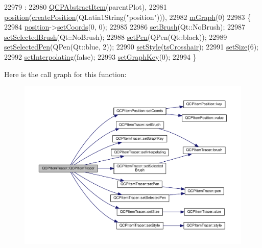 \begin{DoxyCode}
22979                                                     :
22980   \hyperlink{class_q_c_p_abstract_item_a9922507d8b4503a1fe1ed0b1030e23b6}{QCPAbstractItem}(parentPlot),
22981   \hyperlink{class_q_c_p_item_tracer_a69917e2fdb2b3a929c196958feee7cbe}{position}(\hyperlink{class_q_c_p_abstract_item_a75036d39c4d4e2e1a7dd145fff915d32}{createPosition}(QLatin1String(\textcolor{stringliteral}{"position"}))),
22982   \hyperlink{class_q_c_p_item_tracer_a2d70cf616b579563aa15f796dfc143ac}{mGraph}(0)
22983 \{
22984   \hyperlink{class_q_c_p_item_tracer_a69917e2fdb2b3a929c196958feee7cbe}{position}->\hyperlink{class_q_c_p_item_position_aa988ba4e87ab684c9021017dcaba945f}{setCoords}(0, 0);
22985 
22986   \hyperlink{class_q_c_p_item_tracer_a2c303f7470a30084daa201ed556b3c36}{setBrush}(Qt::NoBrush);
22987   \hyperlink{class_q_c_p_item_tracer_a0f55c084980a7a312af859d3e7b558ef}{setSelectedBrush}(Qt::NoBrush);
22988   \hyperlink{class_q_c_p_item_tracer_af8048636fc1ef0152e51809b008df2ca}{setPen}(QPen(Qt::black));
22989   \hyperlink{class_q_c_p_item_tracer_ae1bf70db7f13f928660168cd3e5069f3}{setSelectedPen}(QPen(Qt::blue, 2));
22990   \hyperlink{class_q_c_p_item_tracer_a41a2ac4f1acd7897b4e2a2579c03204e}{setStyle}(\hyperlink{class_q_c_p_item_tracer_a2f05ddb13978036f902ca3ab47076500af562ec81ac3ba99e26ef8540cf1ec16f}{tsCrosshair});
22991   \hyperlink{class_q_c_p_item_tracer_ae47fe0617f5fef5fdb766999569be10a}{setSize}(6);
22992   \hyperlink{class_q_c_p_item_tracer_a6c244a9d1175bef12b50afafd4f5fcd2}{setInterpolating}(\textcolor{keyword}{false});
22993   \hyperlink{class_q_c_p_item_tracer_a6840143b42f3b685cedf7c6d83a704c8}{setGraphKey}(0);
22994 \}
\end{DoxyCode}


Here is the call graph for this function\+:\nopagebreak
\begin{figure}[H]
\begin{center}
\leavevmode
\includegraphics[width=350pt]{class_q_c_p_item_tracer_adc5ca846eeac323db4aa1fc4081e36be_cgraph}
\end{center}
\end{figure}


